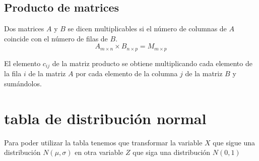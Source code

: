 \documentclass{article}
\numberwithin{equation}{section}
\theoremstyle{plain}  %
\begin{document}
    \subsection{Producto de matrices}
    Dos matrices $A$ y $B$ se dicen multiplicables si el número de columnas de $A$ coincide con el número de filas de $B$.
    \begin{equation*}
        A_{m\times n} \times B_{n\times p} = M_{m\times p}
    \end{equation*}

    El elemento $c_{ij}$ de la matriz producto se obtiene multiplicando cada elemento de la fila $i$ de la matriz 
    $A$ por cada elemento de la columna $j$ de la matriz $B$ y sumándolos.
\section{tabla de distribución normal}
Para poder utilizar la tabla tenemos que transformar la variable $X$ que sigue una distribución $N(\mu, \sigma)$ 
en otra variable $Z$ que siga una distribución $N(0, 1)$\\
\end{document}
